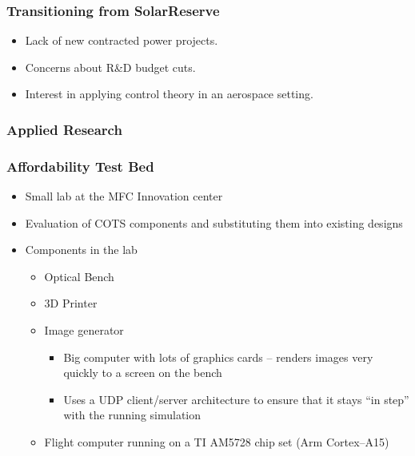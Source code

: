 \documentclass[aspectratio=169]{beamer}
\begin{document}
\begin{frame}
  \frametitle{Transitioning from SolarReserve}
  \begin{itemize}
  \item Lack of new contracted power projects.
  \item Concerns about R\&D budget cuts.
  \item Interest in applying control theory in an aerospace setting.
  \end{itemize}
\end{frame}

\subsubsection{Applied Research}

\begin{frame}
  \frametitle{Affordability Test Bed}
  \begin{itemize}
  \item Small lab at the MFC Innovation center
  \item Evaluation of COTS components and substituting them into
    existing designs
  \item Components in the lab
    \begin{itemize}
    \item Optical Bench
    \item 3D Printer
    \item Image generator
      \begin{itemize}
        \item Big computer with lots of graphics cards --
          renders images very quickly to a screen on the bench
        \item Uses a UDP client/server architecture to ensure that it
          stays ``in step'' with the running simulation
      \end{itemize}
    \item Flight computer running on a TI AM5728 chip set (Arm Cortex--A15)
    \end{itemize}
  \end{itemize}
\end{frame}
\end{document}
